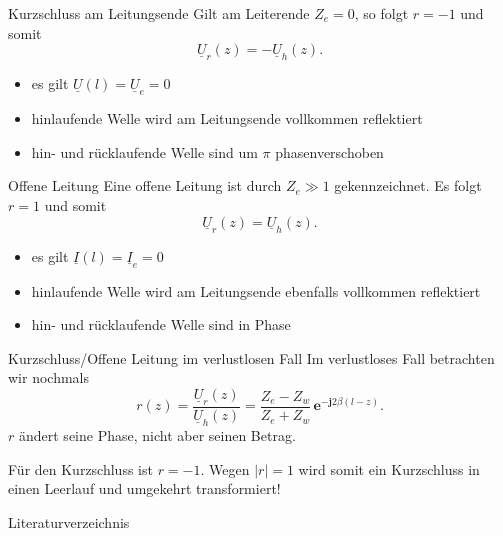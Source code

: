 \documentclass{beamer}
\begin{document}
\begin{frame}{Kurzschluss am Leitungsende}
Gilt am Leiterende $Z_{e} = 0$, so folgt $r = -1$ und somit
\[
\underline{U}_{r}(z) = - \underline{U}_{h}(z).
\]

\begin{itemize}
    \item<2-> es gilt $\underline{U}(l) = \underline{U}_{e} = 0$
    \item<3-> hinlaufende Welle wird am Leitungsende vollkommen reflektiert
    \item<4-> hin- und rücklaufende Welle sind um $\pi$ phasenverschoben
\end{itemize}

\end{frame}


\begin{frame}{Offene Leitung}
Eine offene Leitung ist durch $Z_{e} \gg 1$ gekennzeichnet. Es folgt $r = 1$ und somit
\[
\underline{U}_{r}(z) = \underline{U}_{h}(z).
\]

\begin{itemize}
    \item<2-> es gilt $\underline{I}(l) = \underline{I}_{e} = 0$
    \item<3-> hinlaufende Welle wird am Leitungsende ebenfalls vollkommen reflektiert
    \item<4-> hin- und rücklaufende Welle sind in Phase
\end{itemize}

\end{frame}


\begin{frame}{Kurzschluss/Offene Leitung im verlustlosen Fall}
Im verlustloses Fall betrachten wir nochmals
\[
r(z) = \frac{\underline{U}_{r}(z)}{\underline{U}_{h}(z)} =
\frac{Z_{e}-Z_{w}}{Z_{e}+Z_{w}} \, \mathbf{e}^{-\mathbf{j} 2 \beta (l-z)}.
\]
$r$ ändert seine Phase, nicht aber seinen Betrag.
\vspace{1ex}

Für den Kurzschluss ist $r=-1$. Wegen $|r|=1$ wird somit ein Kurzschluss in einen Leerlauf und
umgekehrt transformiert!
\end{frame}


\begin{frame}{Literaturverzeichnis}
\printbibliography
\end{frame}
\end{document}
